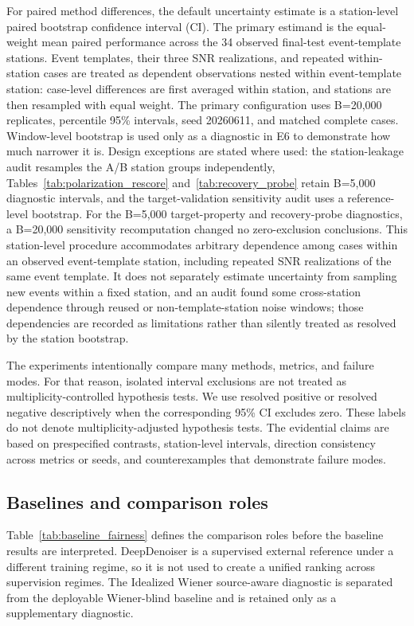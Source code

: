 \documentclass[review,12pt,authoryear]{elsarticle}
\begin{document}
For paired method differences, the default uncertainty estimate is a station-level paired bootstrap confidence interval (CI). The primary estimand is the equal-weight mean paired performance across the 34 observed final-test event-template stations. Event templates, their three SNR realizations, and repeated within-station cases are treated as dependent observations nested within event-template station: case-level differences are first averaged within station, and stations are then resampled with equal weight. The primary configuration uses B=20,000 replicates, percentile 95\% intervals, seed 20260611, and matched complete cases. Window-level bootstrap is used only as a diagnostic in E6 to demonstrate how much narrower it is. Design exceptions are stated where used: the station-leakage audit resamples the A/B station groups independently, Tables~\ref{tab:polarization_rescore} and~\ref{tab:recovery_probe} retain B=5,000 diagnostic intervals, and the target-validation sensitivity audit uses a reference-level bootstrap. For the B=5,000 target-property and recovery-probe diagnostics, a B=20,000 sensitivity recomputation changed no zero-exclusion conclusions. This station-level procedure accommodates arbitrary dependence among cases within an observed event-template station, including repeated SNR realizations of the same event template. It does not separately estimate uncertainty from sampling new events within a fixed station, and an audit found some cross-station dependence through reused or non-template-station noise windows; those dependencies are recorded as limitations rather than silently treated as resolved by the station bootstrap.

The experiments intentionally compare many methods, metrics, and failure modes. For that reason, isolated interval exclusions are not treated as multiplicity-controlled hypothesis tests. We use resolved positive or resolved negative descriptively when the corresponding 95\% CI excludes zero. These labels do not denote multiplicity-adjusted hypothesis tests. The evidential claims are based on prespecified contrasts, station-level intervals, direction consistency across metrics or seeds, and counterexamples that demonstrate failure modes.

\subsection{Baselines and comparison roles}
Table~\ref{tab:baseline_fairness} defines the comparison roles before the baseline results are interpreted. DeepDenoiser is a supervised external reference under a different training regime, so it is not used to create a unified ranking across supervision regimes. The Idealized Wiener source-aware diagnostic is separated from the deployable Wiener-blind baseline and is retained only as a supplementary diagnostic.
\end{document}
